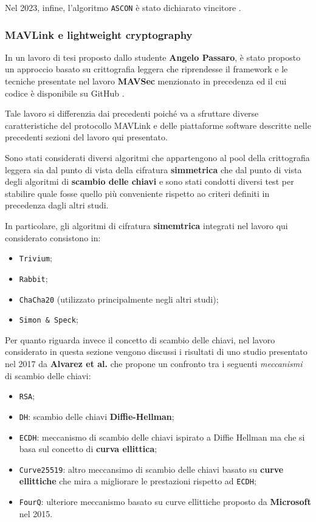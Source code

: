 \documentclass[a4paper, 12pt, oneside]{article}
\theoremstyle{definition}
\begin{document}
Nel 2023, infine, l'algoritmo \texttt{ASCON} è stato dichiarato vincitore \cite{nist-ascon-lwc}.
\newpage
\subsubsection{MAVLink e lightweight cryptography}
In un lavoro di tesi \cite{sec-uav} proposto dallo studente \textbf{Angelo Passaro}, è stato proposto un approccio basato su crittografia leggera che riprendesse il framework e le tecniche presentate nel lavoro \textbf{MAVSec} menzionato in precedenza ed il cui codice è disponibile su GitHub \cite{mavsec-github}.

Tale lavoro si differenzia dai precedenti poiché va a sfruttare diverse caratteristiche del protocollo MAVLink e delle piattaforme software descritte nelle precedenti sezioni del lavoro qui presentato.

Sono stati considerati diversi algoritmi che appartengono al pool della crittografia leggera sia dal punto di vista della cifratura \textbf{simmetrica} che dal punto di vista degli algoritmi di \textbf{scambio delle chiavi} e sono stati condotti diversi test per stabilire quale fosse quello più conveniente rispetto ao criteri definiti in precedenza dagli altri studi.

In particolare, gli algoritmi di cifratura \textbf{simemtrica} integrati nel lavoro qui considerato consistono in:

\begin{itemize}
    \item \texttt{Trivium};
    \item \texttt{Rabbit};
    \item \texttt{ChaCha20} (utilizzato principalmente negli altri studi);
    \item \texttt{Simon \& Speck};
\end{itemize}

Per quanto riguarda invece il concetto di scambio delle chiavi, nel lavoro considerato in questa sezione vengono discussi i risultati di uno studio \cite{10.1007/978-3-319-48799-1_58} presentato nel 2017 da \textbf{Alvarez et al.} che propone un confronto tra i seguenti \textit{meccanismi} di scambio delle chiavi:

\begin{itemize}
    \item \texttt{RSA};
    \item \texttt{DH}: scambio delle chiavi \textbf{Diffie-Hellman};
    \item \texttt{ECDH}: meccanismo di scambio delle chiavi ispirato a Diffie Hellman ma che si basa sul concetto di \textbf{curva ellittica};
    \item \texttt{Curve25519}: altro meccansimo di scambio delle chiavi basato su \textbf{curve ellittiche} che mira a migliorare le prestazioni rispetto ad \texttt{ECDH};
    \item \texttt{FourQ}: ulteriore meccanismo basato su curve ellittiche proposto da \textbf{Microsoft} nel 2015.
\end{itemize}
\end{document}
